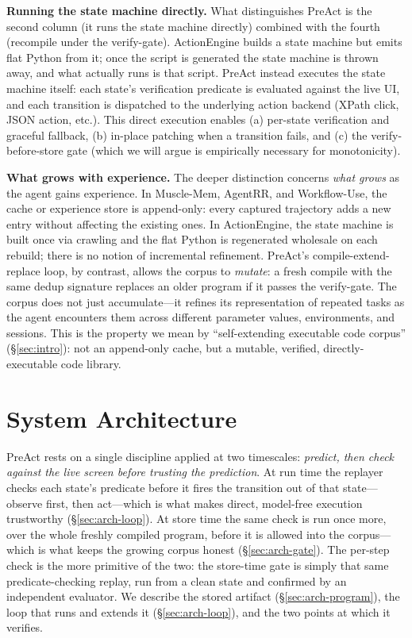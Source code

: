 \documentclass[11pt]{article}
\begin{document}
\textbf{Running the state machine directly.} What distinguishes PreAct is the second column (it runs the state machine directly) combined with the fourth (recompile under the verify-gate). ActionEngine builds a state machine but emits flat Python from it; once the script is generated the state machine is thrown away, and what actually runs is that script. PreAct instead executes the state machine itself: each state's verification predicate is evaluated against the live UI, and each transition is dispatched to the underlying action backend (XPath click, JSON action, etc.). This direct execution enables (a) per-state verification and graceful fallback, (b) in-place patching when a transition fails, and (c) the verify-before-store gate (which we will argue is empirically necessary for monotonicity).

\textbf{What grows with experience.} The deeper distinction concerns \emph{what grows} as the agent gains experience. In Muscle-Mem, AgentRR, and Workflow-Use, the cache or experience store is append-only: every captured trajectory adds a new entry without affecting the existing ones. In ActionEngine, the state machine is built once via crawling and the flat Python is regenerated wholesale on each rebuild; there is no notion of incremental refinement. PreAct's compile-extend-replace loop, by contrast, allows the corpus to \emph{mutate}: a fresh compile with the same dedup signature replaces an older program if it passes the verify-gate. The corpus does not just accumulate---it refines its representation of repeated tasks as the agent encounters them across different parameter values, environments, and sessions. This is the property we mean by ``self-extending executable code corpus'' (\S\ref{sec:intro}): not an append-only cache, but a mutable, verified, directly-executable code library.

\section{System Architecture}
\label{sec:arch}

PreAct rests on a single discipline applied at two timescales: \emph{predict, then check against the live screen before trusting the prediction}. At run time the replayer checks each state's predicate before it fires the transition out of that state---observe first, then act---which is what makes direct, model-free execution trustworthy (\S\ref{sec:arch-loop}). At store time the same check is run once more, over the whole freshly compiled program, before it is allowed into the corpus---which is what keeps the growing corpus honest (\S\ref{sec:arch-gate}). The per-step check is the more primitive of the two: the store-time gate is simply that same predicate-checking replay, run from a clean state and confirmed by an independent evaluator. We describe the stored artifact (\S\ref{sec:arch-program}), the loop that runs and extends it (\S\ref{sec:arch-loop}), and the two points at which it verifies.
\end{document}
